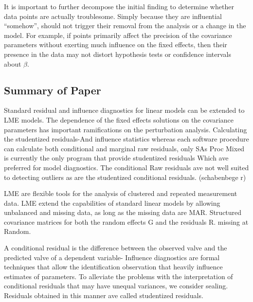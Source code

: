 \documentclass[12pt, a4paper]{article}
\begin{document}
It is important to further decompose the initial finding to determine whether data points are actually troublesome.
Simply because they are influential “somehow”, should not trigger their removal from the analysis or
a change in the model. For example, if points primarily affect the precision of the covariance parameters
without exerting much influence on the fixed effects, then their presence in the data may not distort hypothesis
tests or confidence intervals about $\beta$.

\subsection{Summary of Paper}

Standard residual and influence diagnostics for linear models can be extended to LME models.
The dependence of the fixed effects solutions on the covariance parameters has important ramifications on the perturbation analysis.	
Calculating the studentized residuals-And influence statistics whereas each software procedure can calculate both conditional and marginal raw residuals, only SAs Proc Mixed is currently the only program that provide studentized residuals Which ave preferred for model diagnostics. The conditional Raw residuals ave not well suited to detecting outliers as are the studentized conditional residuals. (schabenbege r)


LME are flexible tools for the analysis of clustered and repeated measurement data. LME extend the capabilities of standard linear models by allowing unbalanced and missing data, as long as the missing data are MAR. Structured covariance matrices for both the random effects G and the residuals R. missing at Random.

A conditional residual is the difference between the observed valve and the predicted valve of a dependent variable- Influence diagnostics are formal techniques that allow the identification observation that heavily influence estimates of parameters.
To alleviate the problems with the interpretation of conditional residuals that may have unequal variances, we consider sealing.
Residuals obtained in this manner ave called studentized residuals.
\end{document}
